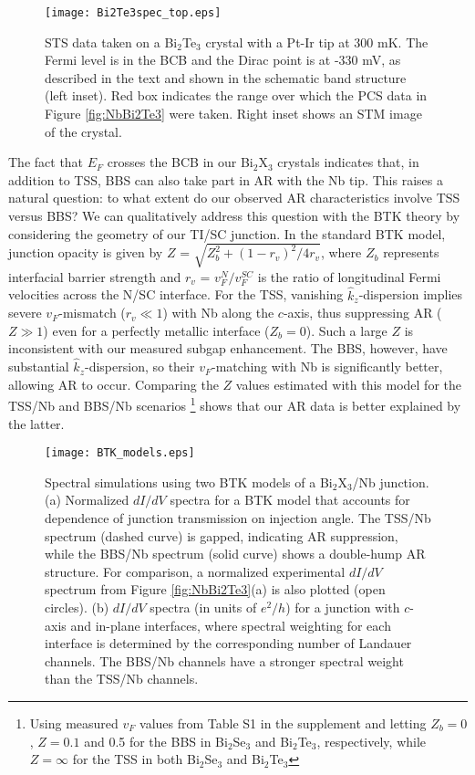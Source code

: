 \documentclass[aps,prl,twocolumn,showpacs,amsmath,amssymb,superscriptaddress,citeautoscript]{revtex4-1}
\begin{document}
\begin{figure}
\texttt{[image: Bi2Te3spec\_top.eps]}
\caption{\label{fig:Bi2Te3SpecTop} STS data taken on a Bi$_{2}$Te$_{3}$ crystal with a Pt-Ir tip at 300 mK.  The Fermi level is in the BCB and the Dirac point is at -330 mV, as described in the text and shown in the schematic band structure (left inset).  Red box indicates the range over which the PCS data in Figure \ref{fig:NbBi2Te3} were taken.  Right inset shows an STM image of the crystal.}
\end{figure}

The fact that $E_{F}$ crosses the BCB in our Bi$_{2}$X$_{3}$ crystals indicates that, in addition to TSS, BBS can also take part in AR with the Nb tip.  This raises a natural question: to what extent do our observed AR characteristics involve TSS versus BBS?  We can qualitatively address this question with the BTK theory by considering the geometry of our TI/SC junction.  In the standard BTK model, junction opacity is given by $Z$ = $\sqrt{Z_b^2 + (1-r_v)^{2}/4r_v}$, where $Z_b$ represents interfacial barrier strength and $r_v$ = $v^N_F / v^{SC}_F$ is the ratio of longitudinal Fermi velocities across the N/SC interface. For the TSS, vanishing $\hat{k}_z$-dispersion implies severe $v_F$-mismatch ($r_v \ll 1$) with Nb along the $c$-axis, thus suppressing AR ($Z \gg 1$) even for a perfectly metallic interface ($Z_b = 0$). Such a large $Z$ is inconsistent with our measured subgap enhancement. The BBS, however, have substantial $\hat{k}_z$-dispersion, so their $v_F$-matching with Nb is significantly better, allowing AR to occur. Comparing the $Z$ values estimated with this model for the TSS/Nb and BBS/Nb scenarios \footnote{Using measured $v_F$ values from Table S1 in the supplement and letting $Z_b=0$, $Z=0.1$ and 0.5 for the BBS in Bi$_2$Se$_3$ and Bi$_2$Te$_3$, respectively, while $Z=\infty$ for the TSS in both Bi$_2$Se$_3$ and Bi$_2$Te$_3$} shows that our AR data is better explained by the latter.

\begin{figure}[th]
\texttt{[image: BTK\_models.eps]}
\caption{\label{fig:BTK_models} 
Spectral simulations using two BTK models of a Bi$_2$X$_3$/Nb junction. (a) Normalized $dI/dV$ spectra for a BTK model that accounts for dependence of junction transmission on injection angle. The TSS/Nb spectrum (dashed curve) is gapped, indicating AR suppression, while the BBS/Nb spectrum (solid curve) shows a double-hump AR structure.  For comparison, a normalized experimental $dI/dV$ spectrum from Figure \ref{fig:NbBi2Te3}(a) is also plotted (open circles). (b) $dI/dV$ spectra (in units of $e^2/ h$) for a junction with $c$-axis and in-plane interfaces, where spectral weighting for each interface is determined by the corresponding number of Landauer channels. The BBS/Nb channels have a stronger spectral weight than the TSS/Nb channels.}
\end{figure}
\end{document}
